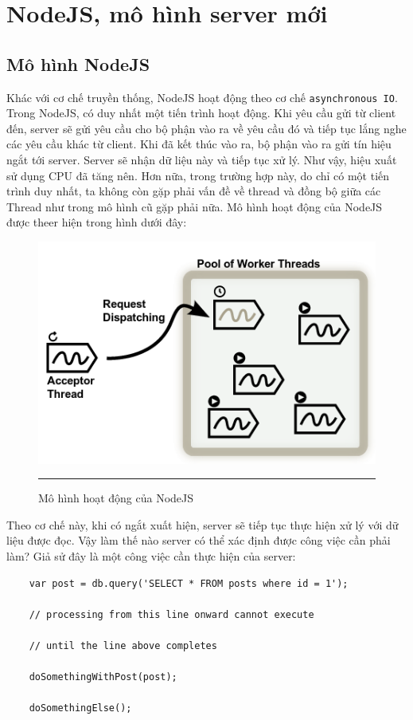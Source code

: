 \documentclass[a4paper,12pt]{report}
\begin{document}
     \section{NodeJS, mô hình server mới}
	\subsection{Mô hình NodeJS}
	Khác với cơ chế truyền thống, NodeJS hoạt động theo cơ chế \texttt{asynchronous IO}. Trong NodeJS, có duy nhất một tiến trình hoạt động. Khi yêu cầu gửi từ client đến, server sẽ gửi yêu cầu cho bộ phận vào ra về yêu cầu đó và tiếp tục lắng nghe các yêu cầu khác từ client. Khi đã kết thúc vào ra, bộ phận vào ra gửi tín hiệu ngắt tới server. Server sẽ nhận dữ liệu này và tiếp tục xử lý. Như vậy, hiệu xuất sử dụng CPU đã tăng nên. Hơn nữa, trong trường hợp này, do chỉ có một tiến trình duy nhất, ta không còn gặp phải vấn đề về thread và đồng bộ giữa các Thread như trong mô hình cũ gặp phải nữa. Mô hình hoạt động của NodeJS được theer hiện trong hình dưới đây:
	\begin{figure}
        \centering
        \includegraphics[scale=0.7]{io}
        \rule{35em}{0.5pt}
        \caption{Mô hình hoạt động của NodeJS}
        \label{fig:nio}
    \end{figure}
	Theo cơ chế này, khi có ngắt xuất hiện, server sẽ tiếp tục thực hiện xử lý với dữ liệu được đọc. Vậy làm thế nào server có thể xác định được công việc cần phải làm? Giả sử đây là một công việc cần thực hiện của server:
\begin{verbatim}
	var post = db.query('SELECT * FROM posts where id = 1');

	// processing from this line onward cannot execute

	// until the line above completes

	doSomethingWithPost(post);

	doSomethingElse();
\end{verbatim}
\end{document}
